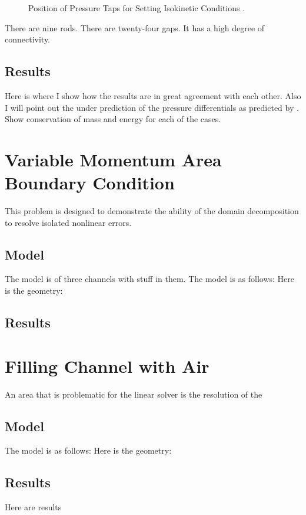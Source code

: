 \begin{figure}[ht]
\centering

\caption{Position of Pressure Taps for Setting Isokinetic Conditions \cite{Lahey1970}.}
\label{fig:channel_layout}
\end{figure}

There are nine rods.
There are twenty-four gaps.
It has a high degree of connectivity.

\subsection{Results}
\label{subsect:ge_results}
Here is where I show how the results are in great agreement with each other.
Also I will point out the under prediction of the pressure differentials as predicted by \cobra{}.
Show conservation of mass and energy for each of the cases.

\section{Variable Momentum Area Boundary Condition}
\label{sect:varAmom}
This problem is designed to demonstrate the ability of the domain decomposition to resolve isolated nonlinear errors. 

\subsection{Model}
\label{subsect:varAmomModel}
The model is of three channels with stuff in them.
The model is as follows:
Here is the geometry:

\subsection{Results}
\label{subsect:varAmomResults}

\section{Filling Channel with Air}
\label{sect:varFillWithAir}
An area that is problematic for the linear solver is the resolution of the 

\subsection{Model}
\label{subsect:varFWAModel}
The model is as follows:
Here is the geometry:

\subsection{Results}
\label{subsect:varFWAResults}
Here are results

